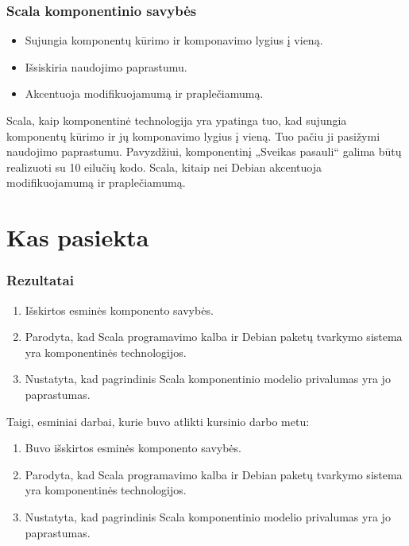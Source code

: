 \begin{frame}
  \frametitle{Scala komponentinio savybės}
  \begin{itemize}
    \item Sujungia komponentų kūrimo ir komponavimo lygius į vieną.
    \item Išsiskiria naudojimo paprastumu.
    \item Akcentuoja modifikuojamumą ir praplečiamumą.
  \end{itemize}
  \begin{handout}
    Scala, kaip komponentinė technologija yra ypatinga tuo, kad
    sujungia komponentų kūrimo ir jų komponavimo lygius į vieną.
    Tuo pačiu ji pasižymi naudojimo paprastumu. Pavyzdžiui, komponentinį
    „Sveikas pasauli“ galima būtų realizuoti su 10 eilučių kodo.
    Scala, kitaip nei Debian akcentuoja modifikuojamumą ir praplečiamumą.
  \end{handout}
\end{frame}

\section{Kas pasiekta}

\begin{frame}
  \frametitle{Rezultatai}
  \begin{enumerate}
    \item Išskirtos esminės komponento savybės.
    \item Parodyta, kad Scala programavimo kalba ir Debian paketų
      tvarkymo sistema yra komponentinės technologijos.
    \item Nustatyta, kad pagrindinis Scala komponentinio modelio
      privalumas yra jo paprastumas.
  \end{enumerate}
  \begin{handout}
    Taigi, esminiai darbai, kurie buvo atlikti kursinio darbo metu:
    \begin{enumerate}
      \item Buvo išskirtos esminės komponento savybės.
      \item Parodyta, kad Scala programavimo kalba ir Debian paketų
        tvarkymo sistema yra komponentinės technologijos.
      \item Nustatyta, kad pagrindinis Scala komponentinio modelio
        privalumas yra jo paprastumas.
    \end{enumerate}
  \end{handout}
\end{frame}

